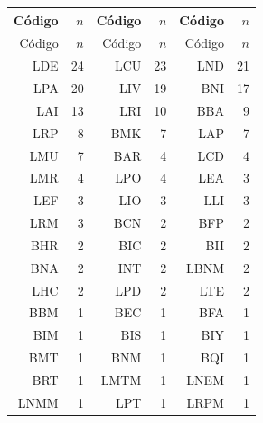 \begin{longtable}{rr@{\qquad}rr@{\qquad}rr}
\toprule
Código & $n$ & Código & $n$ & Código & $n$ \\
\midrule
\endfirsthead
\toprule
Código & $n$ & Código & $n$ & Código & $n$ \\
\midrule
\endhead
LDE & 24 & LCU & 23 & LND & 21 \\
LPA & 20 & LIV & 19 & BNI & 17 \\
LAI & 13 & LRI & 10 & BBA & 9 \\
LRP & 8 & BMK & 7 & LAP & 7 \\
LMU & 7 & BAR & 4 & LCD & 4 \\
LMR & 4 & LPO & 4 & LEA & 3 \\
LEF & 3 & LIO & 3 & LLI & 3 \\
LRM & 3 & BCN & 2 & BFP & 2 \\
BHR & 2 & BIC & 2 & BII & 2 \\
BNA & 2 & INT & 2 & LBNM & 2 \\
LHC & 2 & LPD & 2 & LTE & 2 \\
BBM & 1 & BEC & 1 & BFA & 1 \\
BIM & 1 & BIS & 1 & BIY & 1 \\
BMT & 1 & BNM & 1 & BQI & 1 \\
BRT & 1 & LMTM & 1 & LNEM & 1 \\
LNMM & 1 & LPT & 1 & LRPM & 1 \\
\bottomrule
\end{longtable}
